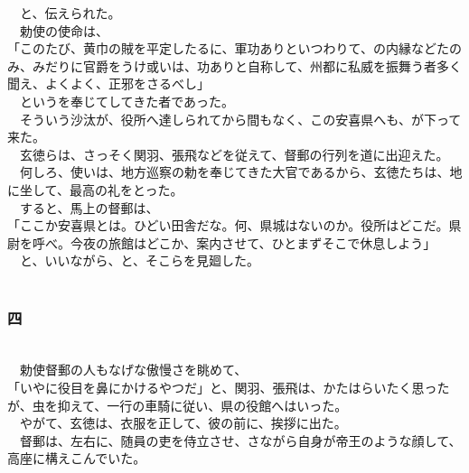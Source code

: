 \documentclass[
  paper=a5,
  fontsize=10pt,
  jafontsize=9.5pt,
  tate,                  %
  open_bracket_pos=nibu, %
]{jlreq}
\begin{document}
　と、伝えられた。\\


　勅使の使命は、\\


「このたび、黄巾の賊を平定したるに、軍功ありといつわりて、の内縁などたのみ、みだりに官爵をうけ或いは、功ありと自称して、州都に私威を振舞う者多く聞え、よくよく、正邪をさるべし」\\


　というを奉じてしてきた者であった。\\


　そういう沙汰が、役所へ達しられてから間もなく、この安喜県へも、が下って来た。\\


　玄徳らは、さっそく関羽、張飛などを従えて、督郵の行列を道に出迎えた。\\


　何しろ、使いは、地方巡察の勅を奉じてきた大官であるから、玄徳たちは、地に坐して、最高の礼をとった。\\


　すると、馬上の督郵は、\\


「ここか安喜県とは。ひどい田舎だな。何、県城はないのか。役所はどこだ。県尉を呼べ。今夜の旅館はどこか、案内させて、ひとまずそこで休息しよう」\\


　と、いいながら、と、そこらを見廻した。\\

\\

\subsubsection{四}

\\


　勅使督郵の人もなげな傲慢さを眺めて、\\


「いやに役目を鼻にかけるやつだ」と、関羽、張飛は、かたはらいたく思ったが、虫を抑えて、一行の車騎に従い、県の役館へはいった。\\


　やがて、玄徳は、衣服を正して、彼の前に、挨拶に出た。\\


　督郵は、左右に、随員の吏を侍立させ、さながら自身が帝王のような顔して、高座に構えこんでいた。\\
\end{document}
